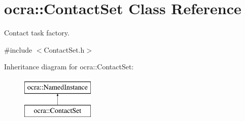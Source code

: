 \hypertarget{classocra_1_1ContactSet}{}\section{ocra\+:\+:Contact\+Set Class Reference}
\label{classocra_1_1ContactSet}


Contact task factory.  




{\ttfamily \#include $<$Contact\+Set.\+h$>$}

Inheritance diagram for ocra\+:\+:Contact\+Set\+:\begin{figure}[H]
\begin{center}
\leavevmode
\includegraphics[height=2.000000cm]{d5/d38/classocra_1_1ContactSet}
\end{center}
\end{figure}
